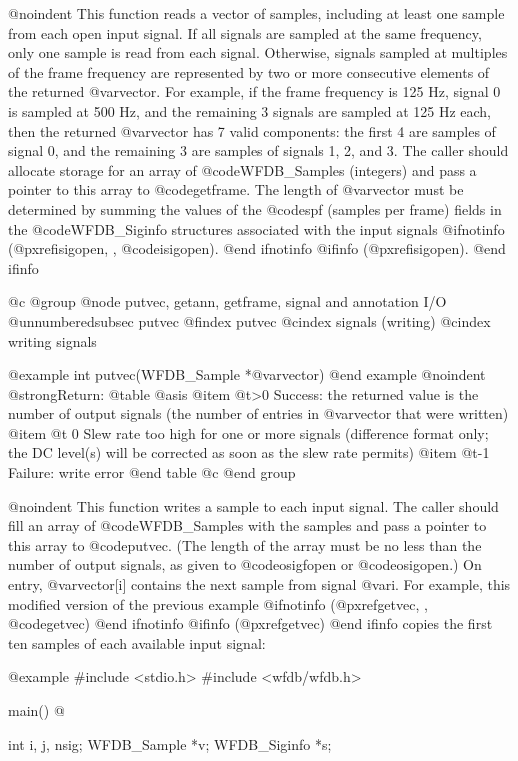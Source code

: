 {{{{{{{{@noindent
This function reads a vector of samples, including at least one sample from
each open input signal.  If all signals are sampled at the same frequency, only
one sample is read from each signal.  Otherwise, signals sampled at multiples
of the frame frequency are represented by two or more consecutive elements of
the returned @var{vector}.  For example, if the frame frequency is 125 Hz,
signal 0 is sampled at 500 Hz, and the remaining 3 signals are sampled at 125
Hz each, then the returned @var{vector} has 7 valid components: the first 4 are
samples of signal 0, and the remaining 3 are samples of signals 1, 2, and 3.
The caller should allocate storage for an array of @code{WFDB_Sample}s
(integers) and pass a pointer to this array to @code{getframe}.  The length of
@var{vector} must be determined by summing the values of the @code{spf}
(samples per frame) fields in the @code{WFDB_Siginfo} structures associated
with the input signals
@ifnotinfo
(@pxref{isigopen, , @code{isigopen}}).
@end ifnotinfo
@ifinfo
(@pxref{isigopen}).
@end ifinfo

@c @group
@node     putvec, getann, getframe, signal and annotation I/O
@unnumberedsubsec putvec
@findex putvec
@cindex signals (writing)
@cindex writing signals

@example
int putvec(WFDB_Sample *@var{vector})
@end example
@noindent
@strong{Return:}
@table @asis
@item @t{>0}
Success: the returned value is the number of output signals (the number
of entries in @var{vector} that were written)
@item @t{ 0}
Slew rate too high for one or more signals (difference format only; the
DC level(s) will be corrected as soon as the slew rate permits)
@item @t{-1}
Failure: write error
@end table
@c @end group

@noindent
This function writes a sample to each input signal.  The caller should fill an
array of @code{WFDB_Sample}s with the samples and pass a pointer to this array
to @code{putvec}.  (The length of the array must be no less than the number of
output signals, as given to @code{osigfopen} or @code{osigopen}.)  On entry,
@var{vector[i]} contains the next sample from signal @var{i}.  For example,
this modified version of the previous example
@ifnotinfo
(@pxref{getvec, , @code{getvec}})
@end ifnotinfo
@ifinfo
(@pxref{getvec})
@end ifinfo
copies the first ten samples of each available input signal:

@example
#include <stdio.h>
#include <wfdb/wfdb.h>

main()
@{
    int i, j, nsig;
    WFDB_Sample *v;
    WFDB_Siginfo *s;

}}}}}}}}}
